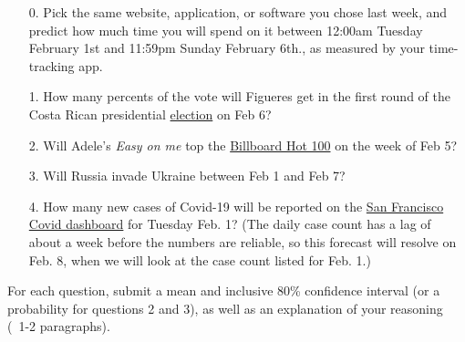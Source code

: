\documentclass[11pt]{article}
\begin{document}
\begin{enumerate}
	\item[0.] Pick the same website, application, or software you chose last week, and predict how much time you will spend on it between 12:00am Tuesday February 1st and 11:59pm Sunday February 6th., as measured by your time-tracking app.
	
	\item[1.] How many percents of the vote will Figueres get in the first round of the Costa Rican presidential \href{https://en.wikipedia.org/wiki/2022_Costa_Rican_general_election}{election} on Feb 6?
	
	\item[2.] Will Adele's \textit{Easy on me} top the \href{https://www.billboard.com/charts/hot-100/}{Billboard Hot 100} on the week of Feb 5?
 
	\item[3.] Will Russia invade Ukraine between Feb 1 and Feb 7?
	
	\item[4.] How many new cases of Covid-19 will be reported on the \href{https://sf.gov/data/covid-19-cases-and-deaths}{San Francisco Covid dashboard} for Tuesday Feb. 1? (The daily case count has a lag of about a week before the numbers are reliable, so this forecast will resolve on Feb. 8, when we will look at the case count listed for Feb. 1.) 
	
	
\end{enumerate}

For each question, submit a mean and inclusive 80\% confidence interval (or a probability for questions 2 and 3), as well as an explanation of your reasoning (~1-2 paragraphs).
\end{document}
